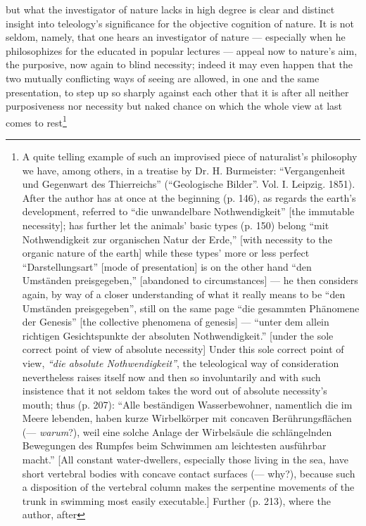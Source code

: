 \documentclass[12pt,a4paper]{book}
\begin{document}
\setcounter{footnote}{0}
but what the investigator of nature lacks in high degree is clear and distinct
insight into teleology's significance for the objective cognition of nature. It
is not seldom, namely, that one hears an investigator of nature --- especially
when he philosophizes for the educated in popular lectures --- appeal now to
nature's aim, the purposive, now again to blind necessity; indeed it may even
happen that the two mutually conflicting ways of seeing are allowed, in one and
the same presentation, to step up so sharply against each other that it is after
all neither purposiveness nor necessity but naked chance on which the whole view
at last comes to rest\footnote{A quite telling example of such an improvised
piece of naturalist's philosophy we have, among others, in a treatise by
Dr. H. Burmeister: ``Vergangenheit und Gegenwart des Thierreichs'' (``Geologische
Bilder''. Vol. I. Leipzig. 1851). After the author has at once at the beginning
(p. 146), as regards the earth's development, referred to ``die unwandelbare
Nothwendigkeit'' [the immutable necessity]; has further let the animals' basic
types (p. 150) belong ``mit Nothwendigkeit zur organischen Natur der Erde,''
[with necessity to the organic nature of the earth] while these types' more or
less perfect ``Darstellungsart'' [mode of presentation] is on the other hand
``den Umständen preisgegeben,'' [abandoned to circumstances] --- he then
considers again, by way of a closer understanding of what it really means to be
``den Umständen preisgegeben'', still on the same page ``die gesammten Phänomene
der Genesis'' [the collective phenomena of genesis] --- ``unter dem allein
richtigen Gesichtspunkte der absoluten Nothwendigkeit.'' [under the sole correct
point of view of absolute necessity] Under this sole correct point of view,
\emph{``die absolute Nothwendigkeit''}, the teleological way of consideration
nevertheless raises itself now and then so involuntarily and with such
insistence that it not seldom takes the word out of absolute necessity's mouth;
thus (p. 207): ``Alle beständigen Wasserbewohner, namentlich die im Meere
lebenden, haben kurze Wirbelkörper mit concaven Berührungsflächen (---
\emph{warum}?), weil eine solche Anlage der Wirbelsäule die schlängelnden
Bewegungen des Rumpfes beim Schwimmen am leichtesten ausführbar macht.'' [All
constant water-dwellers, especially those living in the sea, have short vertebral
bodies with concave contact surfaces (--- why?), because such a
disposition of the vertebral column makes the serpentine movements of the trunk
in swimming most easily executable.] Further (p. 213), where the author, after
}
\end{document}
